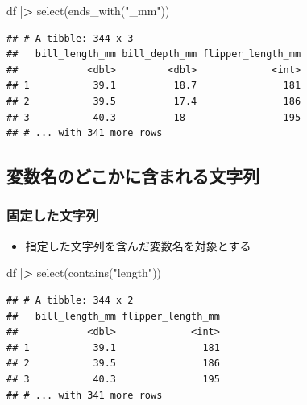 \documentclass[
  xelatex,ja=standard, b5paper]{bxjsbook}
\newenvironment{Shaded}{\begin{snugshade}}{\end{snugshade}}
\newcommand{\ErrorTok}[1]{\textcolor[rgb]{0.64,0.00,0.00}{\textbf{#1}}}
\newcommand{\FunctionTok}[1]{\textcolor[rgb]{0.00,0.00,0.00}{#1}}
\newcommand{\NormalTok}[1]{#1}
\newcommand{\SpecialCharTok}[1]{\textcolor[rgb]{0.00,0.00,0.00}{#1}}
\newcommand{\StringTok}[1]{\textcolor[rgb]{0.31,0.60,0.02}{#1}}
\providecommand{\tightlist}{%
  \setlength{\itemsep}{0pt}\setlength{\parskip}{0pt}}
\begin{document}
\begin{Shaded}
\begin{Highlighting}[]
\NormalTok{df }\SpecialCharTok{|}\ErrorTok{\textgreater{}}
  \FunctionTok{select}\NormalTok{(}\FunctionTok{ends\_with}\NormalTok{(}\StringTok{"\_mm"}\NormalTok{))}
\end{Highlighting}
\end{Shaded}

\begin{verbatim}
## # A tibble: 344 x 3
##   bill_length_mm bill_depth_mm flipper_length_mm
##            <dbl>         <dbl>             <int>
## 1           39.1          18.7               181
## 2           39.5          17.4               186
## 3           40.3          18                 195
## # ... with 341 more rows
\end{verbatim}

\hypertarget{select-helper3}{%
\subsection{変数名のどこかに含まれる文字列}\label{select-helper3}}

\hypertarget{ux56faux5b9aux3057ux305fux6587ux5b57ux5217}{%
\subsubsection{固定した文字列}\label{ux56faux5b9aux3057ux305fux6587ux5b57ux5217}}

\begin{itemize}
\tightlist
\item
  指定した文字列を含んだ変数名を対象とする
\end{itemize}

\begin{Shaded}
\begin{Highlighting}[]
\NormalTok{df }\SpecialCharTok{|}\ErrorTok{\textgreater{}}
  \FunctionTok{select}\NormalTok{(}\FunctionTok{contains}\NormalTok{(}\StringTok{"length"}\NormalTok{))}
\end{Highlighting}
\end{Shaded}

\begin{verbatim}
## # A tibble: 344 x 2
##   bill_length_mm flipper_length_mm
##            <dbl>             <int>
## 1           39.1               181
## 2           39.5               186
## 3           40.3               195
## # ... with 341 more rows
\end{verbatim}
\end{document}
